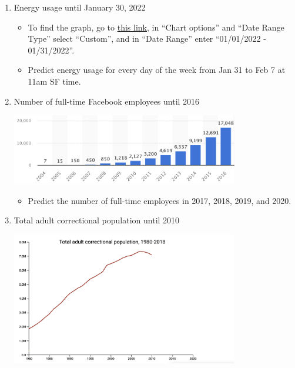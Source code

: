 \documentclass[11pt]{article}
\begin{document}
\begin{enumerate}
	\item Energy usage until January 30, 2022
	
	
	\begin{itemize}
		\item To find the graph, go to \href{https://www.eia.gov/electricity/gridmonitor/expanded-view/electric_overview/US48/US48/ElectricityOverview-2/edit}{this link}, in ``Chart options'' and ``Date Range Type'' select ``Custom'', and in ``Date Range'' enter ``01/01/2022 - 01/31/2022''.
		\item Predict energy usage for every day of the week from Jan 31 to Feb 7 at 11am SF time.
	\end{itemize}
	
	\item Number of full-time Facebook employees until 2016
	
	\begin{center}	
		\includegraphics[width = 375px]{2.png}
	\end{center}

	\begin{itemize}
		\item Predict the number of full-time employees in 2017, 2018, 2019, and 2020.
	\end{itemize}
	
	\item Total adult correctional population until 2010

	\begin{center}	
		\includegraphics[width = 375px]{3.png}
	\end{center}



\end{enumerate}
\end{document}
